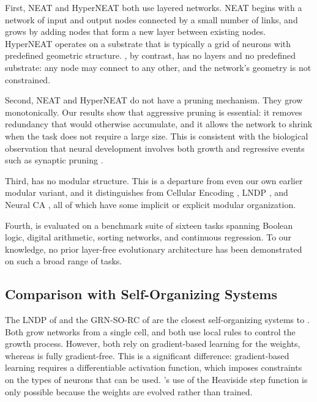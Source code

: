 First, NEAT and HyperNEAT both use layered networks. NEAT begins with a
network of input and output nodes connected by a small number of links,
and grows by adding nodes that form a new layer between existing nodes.
HyperNEAT operates on a substrate that is typically a grid of neurons
with predefined geometric structure. \modnet{}, by contrast, has no
layers and no predefined substrate: any node may connect to any other,
and the network's geometry is not constrained.

Second, NEAT and HyperNEAT do not have a pruning mechanism. They grow
monotonically. Our results show that aggressive pruning is essential:
it removes redundancy that would otherwise accumulate, and it allows
the network to shrink when the task does not require a large size.
This is consistent with the biological observation that neural
development involves both growth and regressive events such as
synaptic pruning \citep{chklovskii2004wiring}.

Third, \modnet{} has no modular structure. This is a departure from
even our own earlier modular variant, and it distinguishes
\modnet{} from Cellular Encoding \citep{gruau1994neural}, LNDP
\citep{plantec2024evolving}, and Neural CA \citep{mordvintsev2020growing},
all of which have some implicit or explicit modular organization.

Fourth, \modnet{} is evaluated on a benchmark suite of sixteen tasks
spanning Boolean logic, digital arithmetic, sorting networks, and
continuous regression. To our knowledge, no prior layer-free
evolutionary architecture has been demonstrated on such a broad range
of tasks.

\subsection{Comparison with Self-Organizing Systems}
\label{sec:disc-self-org}

The LNDP of \citet{plantec2024evolving} and the GRN-SO-RC of
\citet{hajizada2024developmental} are the closest self-organizing
systems to \modnet{}. Both grow networks from a single cell, and both
use local rules to control the growth process. However, both rely on
gradient-based learning for the weights, whereas \modnet{} is fully
gradient-free. This is a significant difference: gradient-based
learning requires a differentiable activation function, which imposes
constraints on the types of neurons that can be used. \modnet{}'s use
of the Heaviside step function is only possible because the weights are
evolved rather than trained.

